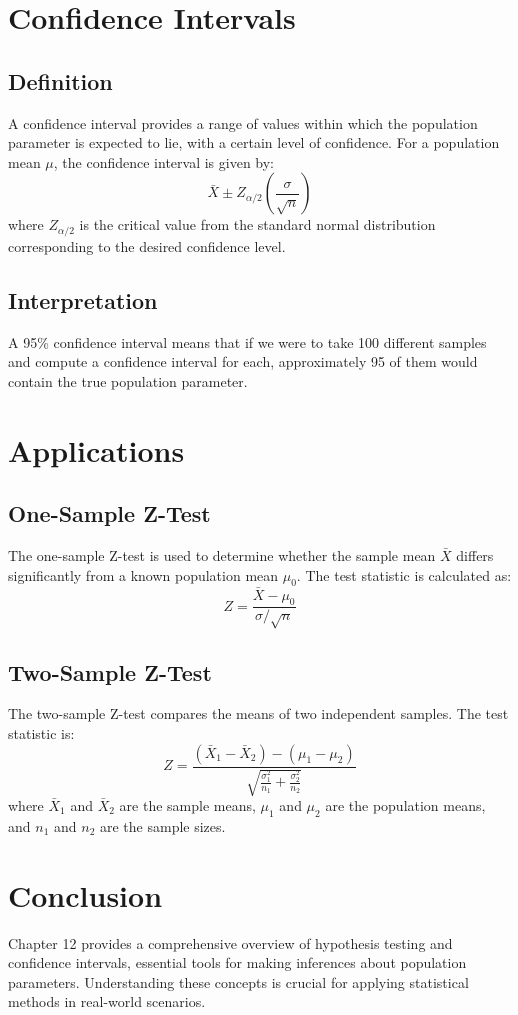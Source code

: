 \documentclass{article}
\begin{document}
\section{Confidence Intervals}
\subsection{Definition}
A confidence interval provides a range of values within which the population parameter is expected to lie, with a certain level of confidence. For a population mean $\mu$, the confidence interval is given by:
\[
\bar{X} \pm Z_{\alpha/2} \left( \frac{\sigma}{\sqrt{n}} \right)
\]
where $Z_{\alpha/2}$ is the critical value from the standard normal distribution corresponding to the desired confidence level.

\subsection{Interpretation}
A 95\% confidence interval means that if we were to take 100 different samples and compute a confidence interval for each, approximately 95 of them would contain the true population parameter.

\section{Applications}
\subsection{One-Sample Z-Test}
The one-sample Z-test is used to determine whether the sample mean $\bar{X}$ differs significantly from a known population mean $\mu_0$. The test statistic is calculated as:
\[
Z = \frac{\bar{X} - \mu_0}{\sigma / \sqrt{n}}
\]

\subsection{Two-Sample Z-Test}
The two-sample Z-test compares the means of two independent samples. The test statistic is:
\[
Z = \frac{(\bar{X}_1 - \bar{X}_2) - (\mu_1 - \mu_2)}{\sqrt{\frac{\sigma_1^2}{n_1} + \frac{\sigma_2^2}{n_2}}}
\]
where $\bar{X}_1$ and $\bar{X}_2$ are the sample means, $\mu_1$ and $\mu_2$ are the population means, and $n_1$ and $n_2$ are the sample sizes.

\section{Conclusion}
Chapter 12 provides a comprehensive overview of hypothesis testing and confidence intervals, essential tools for making inferences about population parameters. Understanding these concepts is crucial for applying statistical methods in real-world scenarios.
\end{document}
